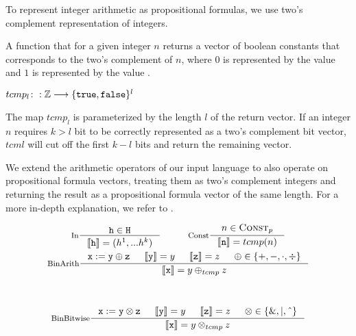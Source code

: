 To represent integer arithmetic as propositional formulas, we use two's complement representation of integers.

\begin{definition}
    A function that for a given integer $n$ returns a vector of boolean constants that corresponds to the two's complement of $n$, where $0$ is represented by the value \fff and $1$ is represented by the value \ttt.
    \begin{center}
        $tcmp_l\colon: \mathbb{Z} \longrightarrow \{ \mathtt{true}, \mathtt{false} \}^l$
    \end{center}
    The map $tcmp_l$ is parameterized by the length $l$ of the return vector. If an integer $n$ requires $k > l$ bit to be correctly represented as a two's complement bit vector, $tcml$ will cut off the first $k - l$ bits and return the remaining vector.
\end{definition}

We extend the arithmetic operators of our input language to also operate on propositional formula vectors, treating them as two's complement integers and returning the result as a propositional formula vector of the same length. For a more in-depth explanation, we refer to \cite{}.
\begin{figure}
    \label{fig:input_deps_computation}
    \centering
    \begin{gather*}
        \inference[In]{\mathtt{h} \in \mathtt{H}}{\depvec{h} = (h^1, ... h^k)} \hspace{1cm}
        \inference[Const]{n \in \text{\textsc{Const}}_p}{\depvec{n} = tcmp(n)} \\ \vspace{1cm}
        \inference[BinArith]{\mathtt{x := y} \oplus \mathtt{z} & \depvec{y} = y & \depvec{z} = z & \oplus \in \{+, -, \cdot, \div\}}{\depvec{x} = y \oplus_{tcmp} z} \\ \vspace{1cm}
        \inference[BinBitwise]{\mathtt{x := y} \otimes \mathtt{z} & \depvec{y} = y & \depvec{z} = z & \otimes \in \{\text{\&}, |, \XOR \}}{\depvec{x} = y \otimes_{tcmp} z}
    \end{gather*}
        
\end{figure}


